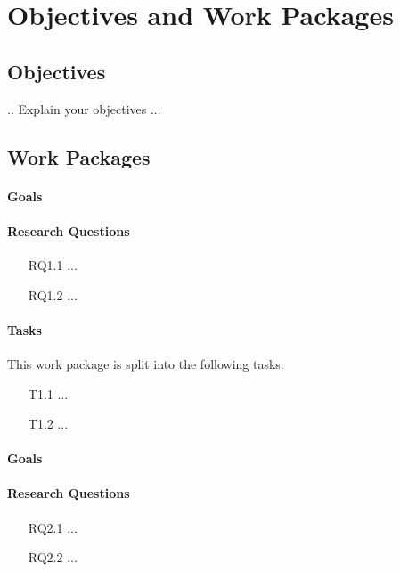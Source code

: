 
\chapter{Objectives and Work Packages}
\label{chap:wp}

\section{Objectives}
.. Explain your objectives ...
\section{Work Packages}
\label{sec-workpackages}



\subsubsection{Goals}


\subsubsection{Research Questions}
\begin{itemize}
	\item[RQ1.1] ...
	\item[RQ1.2] ...
\end{itemize}

\subsubsection{Tasks}
This work package is split into the following tasks:
\begin{itemize}
	\item[T1.1] ...
	\item[T1.2] ...
\end{itemize}


\subsubsection{Goals}


\subsubsection{Research Questions}
\begin{itemize}
	\item[RQ2.1] ...
	\item[RQ2.2] ...
\end{itemize}

